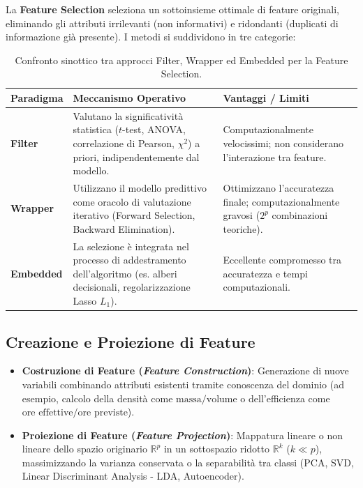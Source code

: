 La \textbf{Feature Selection} seleziona un sottoinsieme ottimale di feature originali, eliminando gli attributi irrilevanti (non informativi) e ridondanti (duplicati di informazione già presente). I metodi si suddividono in tre categorie:

\begin{table}[htbp]
    \centering
    \small
    \begin{tabularx}{\textwidth}{lXX}
        \toprule
        \textbf{Paradigma} & \textbf{Meccanismo Operativo} & \textbf{Vantaggi / Limiti} \\
        \midrule
        \textbf{Filter} & Valutano la significatività statistica ($t$-test, ANOVA, correlazione di Pearson, $\chi^2$) a priori, indipendentemente dal modello. & Computazionalmente velocissimi; non considerano l'interazione tra feature. \\
        \addlinespace
        \textbf{Wrapper} & Utilizzano il modello predittivo come oracolo di valutazione iterativo (Forward Selection, Backward Elimination). & Ottimizzano l'accuratezza finale; computazionalmente gravosi ($2^p$ combinazioni teoriche). \\
        \addlinespace
        \textbf{Embedded} & La selezione è integrata nel processo di addestramento dell'algoritmo (es. alberi decisionali, regolarizzazione Lasso $L_1$). & Eccellente compromesso tra accuratezza e tempi computazionali. \\
        \bottomrule
    \end{tabularx}
    \caption{Confronto sinottico tra approcci Filter, Wrapper ed Embedded per la Feature Selection.}
    \label{tab:dm-feature-selection-methods}
\end{table}

\subsection{Creazione e Proiezione di Feature}
\begin{itemize}
    \item \textbf{Costruzione di Feature (\textit{Feature Construction})}: Generazione di nuove variabili combinando attributi esistenti tramite conoscenza del dominio (ad esempio, calcolo della densità come $\text{massa}/\text{volume}$ o dell'efficienza come $\text{ore effettive}/\text{ore previste}$).
    \item \textbf{Proiezione di Feature (\textit{Feature Projection})}: Mappatura lineare o non lineare dello spazio originario $\mathbb{R}^p$ in un sottospazio ridotto $\mathbb{R}^k$ ($k \ll p$), massimizzando la varianza conservata o la separabilità tra classi (PCA, SVD, Linear Discriminant Analysis - LDA, Autoencoder).
\end{itemize}

